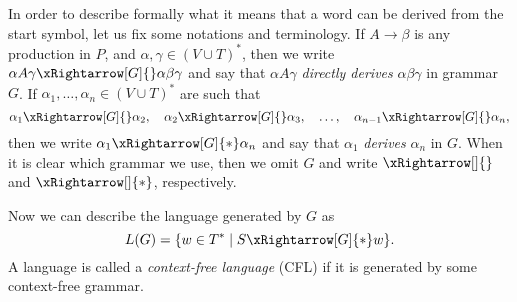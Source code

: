 
In order to describe formally what it means that a word can be derived from the start symbol, let us fix some notations and terminology.
If $A \to \beta$ is any production in $P$, and $\alpha, \gamma \in (V \cup T)^*$,
then we write $\alpha A \gamma \xRightarrow[G]{} \alpha \beta \gamma$
and say that $\alpha A \gamma$ \emph{directly derives} $\alpha\beta\gamma$ in grammar~$G$.
If $\alpha_1, \ldots, \alpha_n \in (V \cup T)^*$ are such that
\[
\alpha_1 \xRightarrow[G]{} \alpha_2, \quad \alpha_2 \xRightarrow[G]{} \alpha_3, \quad \ldots, \quad  \alpha_{n-1} \xRightarrow[G]{} \alpha_n,
\]
then we write $\alpha_1 \xRightarrow[G]{*} \alpha_n$ and say that $\alpha_1$ \emph{derives} $\alpha_n$ in $G$.
When it is clear which grammar we use, then we omit $G$ and write $\xRightarrow[]{}$ and $\xRightarrow[]{*}$, respectively.

Now we can describe the language generated by $G$ as
\[
L(G) = \{w \in T^* \mid S \xRightarrow[G]{*} w\}.
\]
A language is called a \emph{context-free language} (CFL) if it is generated by some context-free grammar.
